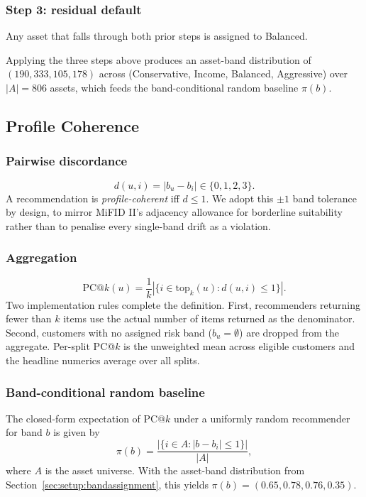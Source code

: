 \subsubsection{Step 3: residual default} Any asset that falls through both prior steps is assigned to Balanced.

Applying the three steps above produces an asset-band distribution of $(190, 333, 105, 178)$ across (Conservative, Income, Balanced, Aggressive) over $|A| = 806$ assets, which feeds the band-conditional random baseline $\pi(b)$.

\subsection{Profile Coherence}
\label{sec:method:pck}

\subsubsection{Pairwise discordance}
\begin{equation}
d(u, i) = |b_u - b_i| \in \{0, 1, 2, 3\}.
\end{equation}
A recommendation is \emph{profile-coherent} iff $d \leq 1$. We adopt this $\pm 1$ band tolerance by design, to mirror MiFID II's adjacency allowance for borderline suitability rather than to penalise every single-band drift as a violation.

\subsubsection{Aggregation}
\begin{equation}
\text{PC@}k(u) = \frac{1}{k} \left|\{ i \in \text{top}_k(u) : d(u, i) \leq 1 \}\right|.
\end{equation}
Two implementation rules complete the definition. First, recommenders returning fewer than $k$ items use the actual number of items returned as the denominator. Second, customers with no assigned risk band ($b_u = \emptyset$) are dropped from the aggregate. Per-split PC@$k$ is the unweighted mean across eligible customers and the headline numerics average over all splits.

\subsubsection{Band-conditional random baseline}
The closed-form expectation of PC@$k$ under a uniformly random recommender for band $b$ is given by
\begin{equation}
\pi(b) = \frac{|\{ i \in A : |b - b_i| \leq 1 \}|}{|A|},
\end{equation}
where $A$ is the asset universe. With the asset-band distribution from Section~\ref{sec:setup:bandassignment}, this yields $\pi(b) = (0.65, 0.78, 0.76, 0.35)$.

